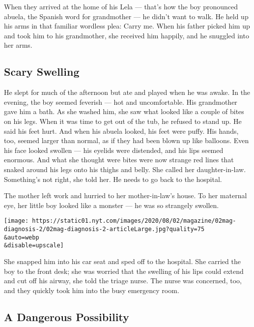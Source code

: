 When they arrived at the home of his Lela --- that's how the boy
pronounced abuela, the Spanish word for grandmother --- he didn't want
to walk. He held up his arms in that familiar wordless plea: Carry me.
When his father picked him up and took him to his grandmother, she
received him happily, and he snuggled into her arms.

\hypertarget{scary-swelling}{%
\subsection{\texorpdfstring{\textbf{Scary
Swelling}}{Scary Swelling}}\label{scary-swelling}}

He slept for much of the afternoon but ate and played when he was awake.
In the evening, the boy seemed feverish --- hot and uncomfortable. His
grandmother gave him a bath. As she washed him, she saw what looked like
a couple of bites on his legs. When it was time to get out of the tub,
he refused to stand up. He said his feet hurt. And when his abuela
looked, his feet were puffy. His hands, too, seemed larger than normal,
as if they had been blown up like balloons. Even his face looked swollen
--- his eyelids were distended, and his lips seemed enormous. And what
she thought were bites were now strange red lines that snaked around his
legs onto his thighs and belly. She called her daughter-in-law.
Something's not right, she told her. He needs to go back to the
hospital.

The mother left work and hurried to her mother-in-law's house. To her
maternal eye, her little boy looked like a monster --- he was so
strangely swollen.

\texttt{[image: https://static01.nyt.com/images/2020/08/02/magazine/02mag-diagnosis-2/02mag-diagnosis-2-articleLarge.jpg?quality=75\\\&auto=webp\\\&disable=upscale]}

She snapped him into his car seat and sped off to the hospital. She
carried the boy to the front desk; she was worried that the swelling of
his lips could extend and cut off his airway, she told the triage nurse.
The nurse was concerned, too, and they quickly took him into the busy
emergency room.

\hypertarget{a-dangerous-possibility}{%
\subsection{\texorpdfstring{\textbf{A Dangerous
Possibility}}{A Dangerous Possibility}}\label{a-dangerous-possibility}}

